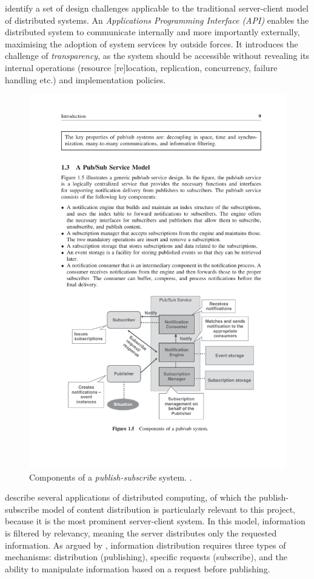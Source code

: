 \documentclass[../report.tex]{subfiles}
\begin{document}
\cite{kshemkalyani2011distributed} identify a set of design challenges applicable to the traditional server-client model of distributed systems. An \textit{Applications Programming Interface (API)} enables the distributed system to communicate internally and more importantly externally, maximising the adoption of system services by outside forces. It introduces the challenge of \textit{transparency}, as the system should be accessible without revealing its internal operations (resource [re]location, replication, concurrency, failure handling etc.) and implementation policies.

\begin{figure}
\centering
\includegraphics[width=0.8\linewidth]{figures/pubsubsystem.pdf}
\caption{Components of a \textit{publish-subscribe} system. \cite[9]{tarkoma2012publish}.}
\label{fig:pubsubsystem}
\end{figure}

\cite{kshemkalyani2011distributed} describe several applications of distributed computing, of which the publish-subscribe model of content distribution is particularly relevant to this project, because it is the most prominent server-client system. In this model, information is filtered by relevancy, meaning the server distributes only the requested information. As argued by \cite{kshemkalyani2011distributed}, information distribution requires three types of mechanisms: distribution (publishing), specific requests (subscribe), and the ability to manipulate information based on a request before publishing. \\
\end{document}
